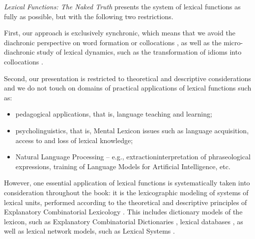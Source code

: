 \textit{Lexical Functions: The Naked Truth} presents the system of lexical functions as fully as possible, but with the following two restrictions.

First, our approach is exclusively synchronic, which means that we avoid the diachronic perspective on word formation or collocations \parencite[cf.][]{Blanco2018-e}, as well as the micro-diachronic study of lexical dynamics, such as the transformation of idioms into collocations \parencite[cf.][]{PausePolguere2020-e,PolguereToAppear}.

Second, our presentation is restricted to theoretical and descriptive considerations and we do not touch on domains of practical applications of lexical functions such as:

\begin{itemize}

\item pedagogical applications, that is, language teaching and learning;

\item psycholinguistics, that is, Mental Lexicon issues such as language acquisition, access to and loss of lexical knowledge;

\item Natural Language Processing -- e.g., extraction\slashs{}interpretation of phraseological expressions, training of Language Models for Artificial Intelligence, etc.

\end{itemize}

However,\label{txt:lexicographicApplications} one essential application of lexical functions is systematically taken into consideration throughout the book: it is the lexicographic modeling of systems of lexical units, performed according to the theoretical and descriptive principles of Explanatory Combinatorial Lexicology \parencites{Melcuketal1995-e}[Ch.~11]{Melcuk2013c-e}. This includes dictionary models of the lexicon, such as Explanatory Combinatorial Dictionaries \parencite{MelcukZholkovsky1984,MelcukZolkovskij2016,MelcukEtAl1984,MelcukEtAl1988,MelcukEtAl1992,MelcukEtAl1999}, lexical databases \parencite{Polguere2000b,AlonsoRamosEtAl2010,BarriosRodriguezBoguslavsky2019}, as well as lexical network models, such as Lexical Systems \parencite{Polguere2014c-e}.

